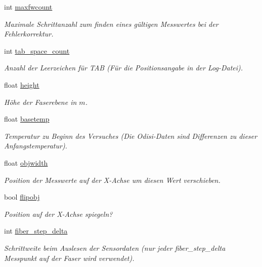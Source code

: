 \begin{DoxyCompactItemize}
int \hyperlink{structOdisiToSdConverter_1_1Options_aca66edaa34e64581ddb68bca902634df}{maxfwcount}
\begin{DoxyCompactList}\small\item\em Maximale Schrittanzahl zum finden eines gültigen Messwertes bei der Fehlerkorrektur. \end{DoxyCompactList}\item 
int \hyperlink{structOdisiToSdConverter_1_1Options_a7dda0229b360a29cd7e4b1ed26e2e71d}{tab\-\_\-space\-\_\-count}
\begin{DoxyCompactList}\small\item\em Anzahl der Leerzeichen für T\-A\-B (Für die Positionsangabe in der Log-\/\-Datei). \end{DoxyCompactList}\item 
float \hyperlink{structOdisiToSdConverter_1_1Options_a9e9609b45b425d128550508772ad69f6}{height}
\begin{DoxyCompactList}\small\item\em Höhe der Faserebene in $m$. \end{DoxyCompactList}\item 
float \hyperlink{structOdisiToSdConverter_1_1Options_a3bda06d5caa4384aba4bd5302b44cde0}{basetemp}
\begin{DoxyCompactList}\small\item\em Temperatur zu Beginn des Versuches (Die Odisi-\/\-Daten sind Differenzen zu dieser Anfangstemperatur). \end{DoxyCompactList}\item 
float \hyperlink{structOdisiToSdConverter_1_1Options_a88d153166692e5bb6a4a37d453b2193c}{objwidth}
\begin{DoxyCompactList}\small\item\em Position der Messwerte auf der X-\/\-Achse um diesen Wert verschieben. \end{DoxyCompactList}\item 
bool \hyperlink{structOdisiToSdConverter_1_1Options_a0117562823f70067df979f4975e5b076}{flipobj}
\begin{DoxyCompactList}\small\item\em Position auf der X-\/\-Achse spiegeln? \end{DoxyCompactList}\item 
int \hyperlink{structOdisiToSdConverter_1_1Options_a550a9730db03bc568f8ac51a269dd286}{fiber\-\_\-step\-\_\-delta}
\begin{DoxyCompactList}\small\item\em Schrittweite beim Auslesen der Sensordaten (nur jeder fiber\-\_\-step\-\_\-delta Messpunkt auf der Faser wird verwendet). \end{DoxyCompactList}\item 

\end{DoxyCompactItemize}
